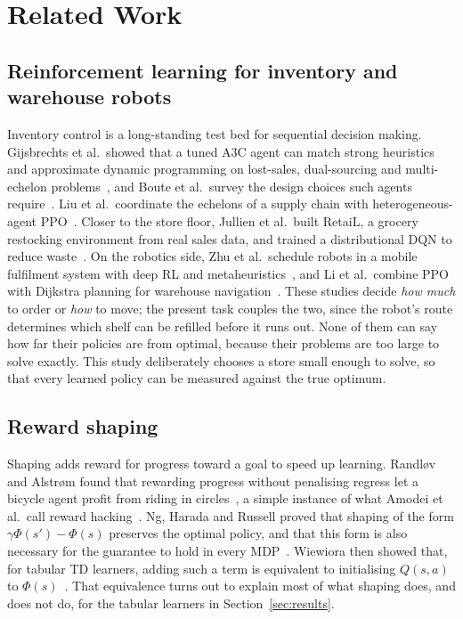 \section{Related Work}
\label{sec:related}

\subsection{Reinforcement learning for inventory and warehouse robots}
Inventory control is a long-standing test bed for sequential decision making. Gijsbrechts et al.\ showed that a tuned A3C agent can match strong heuristics and approximate dynamic programming on lost-sales, dual-sourcing and multi-echelon problems~\cite{gijsbrechts2022}, and Boute et al.\ survey the design choices such agents require~\cite{boute2022}. Liu et al.\ coordinate the echelons of a supply chain with heterogeneous-agent PPO~\cite{liu2025}. Closer to the store floor, Jullien et al.\ built RetaiL, a grocery restocking environment from real sales data, and trained a distributional DQN to reduce waste~\cite{jullien2023}. On the robotics side, Zhu et al.\ schedule robots in a mobile fulfilment system with deep RL and metaheuristics~\cite{zhu2024}, and Li et al.\ combine PPO with Dijkstra planning for warehouse navigation~\cite{li2024}. These studies decide \emph{how much} to order or \emph{how} to move; the present task couples the two, since the robot's route determines which shelf can be refilled before it runs out. None of them can say how far their policies are from optimal, because their problems are too large to solve exactly. This study deliberately chooses a store small enough to solve, so that every learned policy can be measured against the true optimum.

\subsection{Reward shaping}
Shaping adds reward for progress toward a goal to speed up learning. Randl{\o}v and Alstr{\o}m found that rewarding progress without penalising regress let a bicycle agent profit from riding in circles~\cite{randlov1998}, a simple instance of what Amodei et al.\ call reward hacking~\cite{amodei2016}. Ng, Harada and Russell proved that shaping of the form $\gamma\Phi(s')-\Phi(s)$ preserves the optimal policy, and that this form is also necessary for the guarantee to hold in every MDP~\cite{ng1999}. Wiewiora then showed that, for tabular TD learners, adding such a term is equivalent to initialising $Q(s,a)$ to $\Phi(s)$~\cite{wiewiora2003}. That equivalence turns out to explain most of what shaping does, and does not do, for the tabular learners in Section~\ref{sec:results}.

